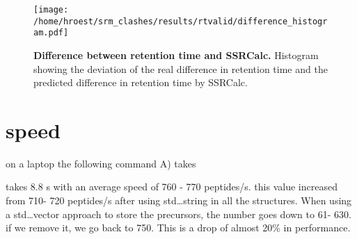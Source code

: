 \begin{figure}
\texttt{[image: /home/hroest/srm\_clashes/results/rtvalid/difference\_histogram.pdf]}
\caption{ \textbf{Difference between retention time and SSRCalc.}
Histogram showing the deviation of the real difference in retention time and
the predicted difference in retention time by SSRCalc. }
\label{fig:DiffHist}
\end{figure}


\section{speed}

on a laptop the following command A) takes


takes 8.8 s with an average speed of 760 - 770 peptides/s. this value
increased from 710- 720
peptides/s after using std\dots string in all the structures. 
When using a std\dots vector approach to store the precursors, the number goes
down to 61- 630. if we remove it, we go back to 750. This is a drop of almost
20\% in performance.





